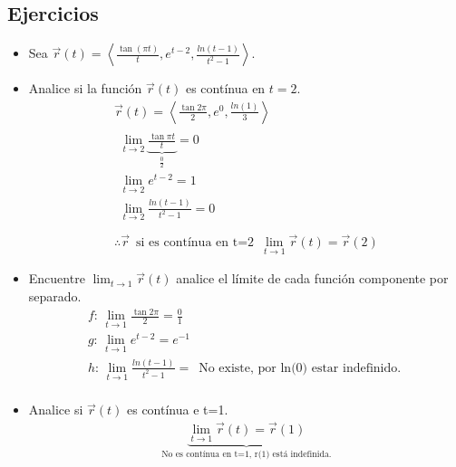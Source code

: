 \documentclass{article}
\begin{document}
\subsection{Ejercicios}
\begin{itemize}
    \item Sea $\vec{r}(t)=\left\langle \frac{\tan(\pi t)}{t} , e^{t-2}, \frac{ln(t-1)}{t^2-1}  \right\rangle $.
    \item Analice si la función $\vec{r}(t)$ es contínua en $t=2$.
        \begin{align*}
            \vec{r}(t) = \left\langle \frac{\tan 2\pi }{2}, e^0, \frac{ln(1)}{3}   \right\rangle \\ 
            \begin{matrix}
                \lim_{t \to 2} \underbrace{\frac{\tan \pi t}{t}}_{\frac{0}{2} } = 0 \\
                \lim_{t \to 2} e^{t-2} = 1 \\ 
                \lim_{t \to 2} \frac{ln(t-1)}{t^2-1} = 0 \\ 
            \end{matrix} \\ 
            \therefore \vec{r} \, \text{ si es contínua en t=2   } \, \lim_{t \to 1} \vec{r}(t) = \vec{r}(2)
        \end{align*}
    
    \item Encuentre $\lim_{t \to 1} \vec{r}(t)$ analice el límite de cada función componente por separado.
        \begin{align*}
            f: \, \lim_{t \to 1} \frac{\tan 2\pi }{2} = \frac{0}{1}  \\ 
            g: \, \lim_{t \to 1} e^{t-2} = e^{-1} \\ 
            h: \, \lim_{t \to 1} \frac{ln(t-1)}{t^2-1} = \, \text{  No existe, por ln(0) estar indefinido.  } \\ 
        \end{align*}
    
    \item Analice si $\vec{r}(t)$ es contínua e t=1.
        \begin{align*}
            \underbrace{\lim_{t \to 1} \vec{r}(t) = \vec{r}(1) }_{\text{  No es contínua en t=1, r(1) está indefinida.  }}\\ 
        \end{align*}
    

\end{itemize}
\end{document}
